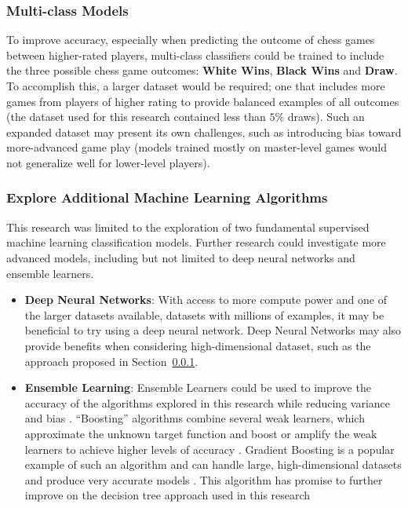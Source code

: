 \documentclass[12pt]{article}
\begin{document}
\subsubsection{Multi-class Models}
\label{sec:multiclass}
To improve accuracy, especially when predicting the outcome of chess games between higher-rated players, multi-class classifiers could be trained to include the three possible chess game outcomes: \textbf{White Wins}, \textbf{Black Wins} and \textbf{Draw}. To accomplish this, a larger dataset would be required; one that includes more games from players of higher rating to provide balanced examples of all outcomes (the dataset used for this research contained less than $5\%$ draws). Such an expanded dataset may present its own challenges, such as introducing bias toward more-advanced game play (models trained mostly on master-level games would not generalize well for lower-level players).

\subsubsection{Explore Additional Machine Learning Algorithms}
This research was limited to the exploration of two fundamental supervised machine learning classification models. Further research could investigate more advanced models, including but not limited to deep neural networks and ensemble learners.

\begin{itemize}[label={}, leftmargin=0pt]
  \item\textbf{Deep Neural Networks}: With access to more compute power and one of the larger datasets available, datasets with millions of examples, it may be beneficial to try using a deep neural network. Deep Neural Networks may also provide benefits when considering high-dimensional dataset, such as the approach proposed in Section~\ref{sec:multiclass}.

  \item\textbf{Ensemble Learning}: Ensemble Learners could be used to improve the accuracy of the algorithms explored in this research while reducing variance and bias \cite[Chapter 7, Section 7.5]{100MLB}. ``Boosting'' algorithms combine several weak learners, which approximate the unknown target function and boost or amplify the weak learners to achieve higher levels of accuracy \cite{Kearns1996}. Gradient Boosting is a popular example of such an algorithm and can handle large, high-dimensional datasets and produce very accurate models \cite{greeksGeeksGB}. This algorithm has promise to further improve on the decision tree approach used in this research
\end{itemize}

\newpage


\end{document}
